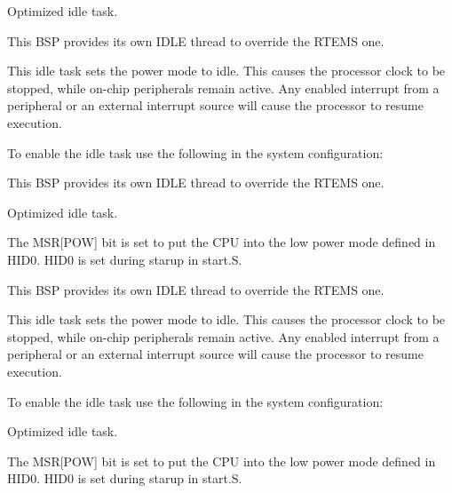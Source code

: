 Optimized idle task. 

This B\+SP provides its own I\+D\+LE thread to override the R\+T\+E\+MS one.

This idle task sets the power mode to idle. This causes the processor clock to be stopped, while on-\/chip peripherals remain active. Any enabled interrupt from a peripheral or an external interrupt source will cause the processor to resume execution.

To enable the idle task use the following in the system configuration\+:


\begin{DoxyCode}{0}
\DoxyCodeLine{\textcolor{preprocessor}{\#include <bsp.h>}}
\DoxyCodeLine{}
\DoxyCodeLine{\textcolor{preprocessor}{\#define CONFIGURE\_INIT}}
\DoxyCodeLine{}
\DoxyCodeLine{\textcolor{preprocessor}{\#define CONFIGURE\_IDLE\_TASK\_BODY bsp\_idle\_thread}}
\DoxyCodeLine{}
\end{DoxyCode}


This B\+SP provides its own I\+D\+LE thread to override the R\+T\+E\+MS one.

Optimized idle task.

The M\+SR\mbox{[}P\+OW\mbox{]} bit is set to put the C\+PU into the low power mode defined in H\+I\+D0. H\+I\+D0 is set during starup in start.\+S.

This B\+SP provides its own I\+D\+LE thread to override the R\+T\+E\+MS one.

This idle task sets the power mode to idle. This causes the processor clock to be stopped, while on-\/chip peripherals remain active. Any enabled interrupt from a peripheral or an external interrupt source will cause the processor to resume execution.

To enable the idle task use the following in the system configuration\+:


\begin{DoxyCode}{0}
\DoxyCodeLine{\textcolor{preprocessor}{\#include <bsp.h>}}
\DoxyCodeLine{}
\DoxyCodeLine{\textcolor{preprocessor}{\#define CONFIGURE\_INIT}}
\DoxyCodeLine{}
\DoxyCodeLine{\textcolor{preprocessor}{\#define CONFIGURE\_IDLE\_TASK\_BODY bsp\_idle\_thread}}
\DoxyCodeLine{}
\end{DoxyCode}


Optimized idle task.

The M\+SR\mbox{[}P\+OW\mbox{]} bit is set to put the C\+PU into the low power mode defined in H\+I\+D0. H\+I\+D0 is set during starup in start.\+S. 